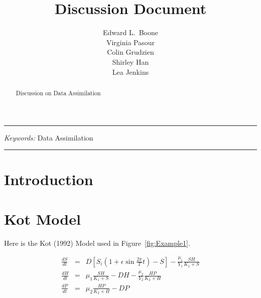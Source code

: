 \documentclass[11pt,twoside]{article}
\numberwithin{equation}{section}
\begin{document}
\title{\large \textbf{Discussion Document}}
\author{
\normalsize Edward L.~Boone\\ 
\normalsize Virginia Pasour \\
\normalsize Colin Grudzien \\
\normalsize Shirley Han \\
\normalsize Lea Jenkins \\
}
\maketitle
\vspace{0.1in}

\hrule
\begin{abstract}
Discussion on Data Assimilation
\end{abstract}
{\em Keywords:} Data Assimilation 
\vspace{0.1in}
\hrule

\section{Introduction}
\label{sect-intro}

\section{Kot Model}
Here is the Kot (1992) Model used in Figure~\ref{fig:Example1}.

\begin{eqnarray*}
  \frac{dS}{dt} &=& D \left[ S_i \left( 1 + \epsilon \sin \frac{2 \pi}{T} t \right) - S \right] - \frac{\mu_1}{Y_1} \frac{SH}{K_1 + S} \\
   \frac{dH}{dt} &=&  \mu_1 \frac{SH}{K_1 + S} - DH -  \frac{\mu_2}{Y_2} \frac{HP}{K_2 + H}  \\
   \frac{dP}{dt} &=&  \mu_2 \frac{HP}{K_2 + H} - DP \\
\end{eqnarray*}
\end{document}
